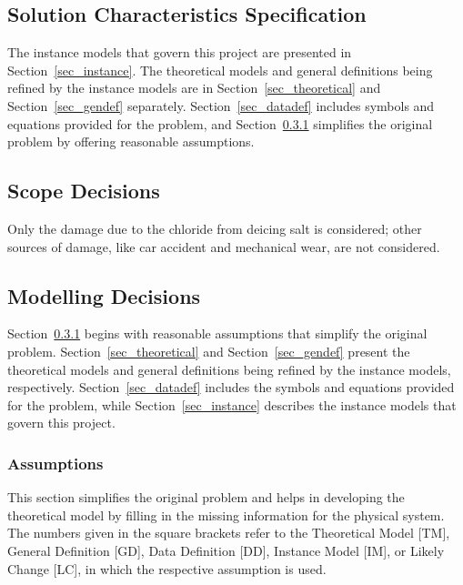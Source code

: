 \documentclass[12pt]{article}
\begin{document}
\subsection{Solution Characteristics Specification}

The instance models that govern this project are presented in Section~\ref{sec_instance}.  The theoretical models and general definitions being refined by the instance models are in Section~\ref{sec_theoretical} and Section~\ref{sec_gendef} separately. Section~\ref{sec_datadef} includes symbols and equations provided for the problem, and Section~\ref{sec_assumpt} simplifies the original problem by offering reasonable assumptions.

\subsection{Scope Decisions}
Only the damage due to the chloride from deicing salt is considered; other sources of damage, like car accident and mechanical wear, are not considered.

\subsection{Modelling Decisions}
Section~\ref{sec_assumpt} begins with reasonable assumptions that simplify the original problem. Section~\ref{sec_theoretical} and Section~\ref{sec_gendef} present the theoretical models and general definitions being refined by the instance models, respectively. Section~\ref{sec_datadef} includes the symbols and equations provided for the problem, while Section~\ref{sec_instance} describes the instance models that govern this project.

\subsubsection{Assumptions} \label{sec_assumpt}

This section simplifies the original problem and helps in developing the
theoretical model by filling in the missing information for the physical system.
The numbers given in the square brackets refer to the Theoretical Model [TM],
General Definition [GD], Data Definition [DD], Instance Model [IM], or Likely
Change [LC], in which the respective assumption is used.
\end{document}
